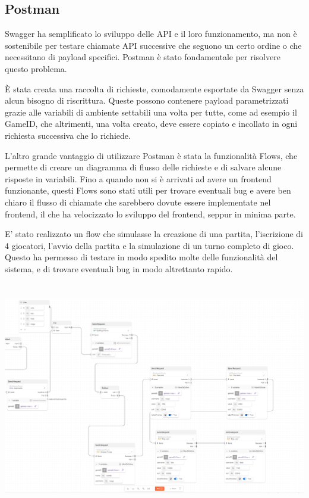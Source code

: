 \subsection{Postman}

Swagger ha semplificato lo sviluppo delle API e il loro funzionamento, ma non è sostenibile per testare chiamate API successive che seguono un certo ordine o che necessitano di payload specifici. Postman è stato fondamentale per risolvere questo problema.

È stata creata una raccolta di richieste, comodamente esportate da Swagger senza alcun bisogno di riscrittura. Queste possono contenere payload parametrizzati grazie alle variabili di ambiente settabili una volta per tutte, come ad esempio il GameID, che altrimenti, una volta creato, deve essere copiato e incollato in ogni richiesta successiva che lo richiede.

L'altro grande vantaggio di utilizzare Postman è stata la funzionalità Flows, che permette di creare un diagramma di flusso delle richieste e di salvare alcune risposte in variabili. Fino a quando non si è arrivati ad avere un frontend funzionante, questi Flows sono stati utili per trovare eventuali bug e avere ben chiaro il flusso di chiamate che sarebbero dovute essere implementate nel frontend, il che ha velocizzato lo sviluppo del frontend, seppur in minima parte.

E' stato realizzato un flow che simulasse la creazione di una partita, l'iscrizione di 4 giocatori, l'avvio della partita e la simulazione di un turno completo di gioco. Questo ha permesso di testare in modo spedito molte delle funzionalità del sistema, e di trovare eventuali bug in modo altrettanto rapido.

\includegraphics[width=18cm, height=10cm]{report/img/postManFlow.png}\\[15.5cm]


